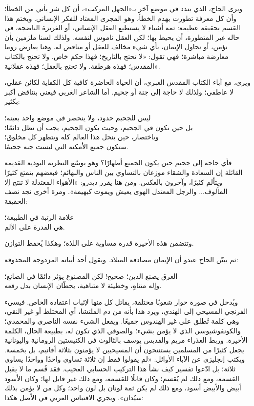 ويرى الحاج، الذي يندد في موضع آخر بـ«الجهل المركب»، أن كل شر يأتي من الخطأ؛ وأن كل معرفة تطورت بهدم الخطأ، وهو المجرى المعتاد للفكر الإنساني. ويختم هذا القسم بحقيقة عظيمة: ثمة أشياء لا يستطيع العقل الإنساني، أو الغريزة الناضجة، في حاله غير المتطورة، أن يحيط بها؛ لكن العقل ناموس لنفسه. ولذلك لسنا ملزمين بأن نؤمن، أو نحاول الإيمان، بأي شيء مخالف للعقل أو مناقض له. وهنا يعارض روما معارضة مباشرة؛ فهي تقول: «لا تحتج بالتاريخ؛ فهذا حكم خاص. ولا تحتج بالكتاب المقدس؛ فهذه هرطقة. ولا تحتج بالعقل؛ فهذه عقلانية».

ويرى، مع آباء الكتاب المقدس العبري، أن الحياة الحاضرة كافية كل الكفاية لكائن عقلي، لا عاطفي؛ ولذلك لا حاجة إلى جنة أو جحيم. أما الشاعر الغربي فيغني بتناقض أكبر بكثير:

\begin{SourceQuotation}
ليس للجحيم حدود، ولا ينحصر في موضع واحد بعينه؛\\
بل حين نكون في الجحيم، وحيث يكون الجحيم، يجب أن نظل دائمًا؛\\
وباختصار، حين ينحل هذا العالم كله ويتطهر كل مخلوق؛\\
ستكون جميع الأمكنة التي ليست جنة جحيمًا.
\end{SourceQuotation}

فأي حاجة إلى جحيم حين يكون الجميع أطهارًا؟ وهو يوسّع النظرية البوذية القديمة القائلة إن السعادة والشقاء موزعان بالتساوي بين الناس والبهائم؛ فبعضهم يتمتع كثيرًا ويتألم كثيرًا، وآخرون بالعكس. ومن هنا يقرر ديدرو: «الأهواء المعتدلة لا تنتج إلا المألوف... والرجل المعتدل الهوى يعيش ويموت كبهيمة». ومرة أخرى نجد نصف الحقيقة:

\begin{SourceQuotation}
علامة الرتبة في الطبيعة؛\\
هي القدرة على الألم.
\end{SourceQuotation}

وتتضمن هذه الأخيرة قدرة مساوية على اللذة؛ وهكذا يُحفظ التوازن.

ثم يبيّن الحاج عبدو أن الإيمان مصادفة الميلاد. ويقول أحد أبياته المزدوجة المحذوفة:

\begin{SourceQuotation}
العرق يصنع الدين؛ صحيح! لكن المصنوع يؤثر دائمًا في الصانع؛\\
وإله متناهٍ، وخطيئة لا متناهية، يحطّان الإنسان بدل رفعه.
\end{SourceQuotation}

ويُدخل في صورة حوار شعوبًا مختلفة، يقاتل كل منها لإثبات اعتقاده الخاص. فيسيء الفرنجي المسيحي إلى الهندي، ويرد هذا بأنه من دم الملتشا، أي المختلط أو غير النقي، وهي كلمة تُطلق على غير الهندوس جميعًا. ويفعل الشيء نفسه الناصري والمحمدي؛ والكونفوشيوسي الذي لا يؤمن بشيء؛ والصوفي الذي تكون له، بطبيعة الحال، الكلمة الأخيرة. وربط العذراء مريم والقديس يوسف بالثالوث في الكنيستين الرومانية واليونانية يجعل كثيرًا من المسلمين يستنتجون أن المسيحيين لا يؤمنون بثلاثة أقانيم، بل بخمسة. ويكتب إنجليزي عن الآباء الأوائل: «لم يقولوا فقط إن ثلاثة تساوي واحدًا وواحدًا يساوي ثلاثة؛ بل ادّعوا تفسير كيف نشأ هذا التركيب الحسابي العجيب. فقد قُسم ما لا يقبل القسمة، ومع ذلك لم يُقسم؛ وكان قابلًا للقسمة، ومع ذلك غير قابل لها؛ وكان الأسود أبيض والأبيض أسود، ومع ذلك لم يكن ثمة لونان بل لون واحد؛ وكل من لا يؤمن بذلك سيُدان». ويجري الاقتباس العربي في الأصل هكذا:

